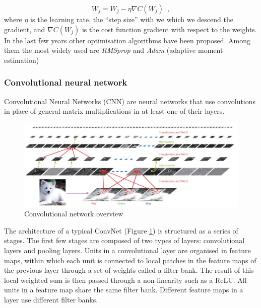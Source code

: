 \begin{equation}
    W_j = W_j - \eta\nabla C(W_j)
    \enspace,
\end{equation}
where $\eta$ is the learning rate, the “step size” with we which we descend the gradient, and $\nabla C(W_j)$ is the cost function gradient with respect to the weights.
In the last few years other optimisation algorithms have been proposed. Among them the most widely used are \textit{RMSprop} and \textit{Adam} (adaptive moment estimation) \citep{kingma2014adam}

\subsubsection{Convolutional neural network} \label{Convolutional Neural Network}

Convolutional Neural Networks (CNN) are neural networks that use convolutions in place of general matrix multiplications in at least one of their layers. 
\begin{figure}
\centerline{\includegraphics[scale=0.7]{images/chapter_2/CNN.jpg}}
\caption{Convolutional network overview \citep{DBLP:journals/nature/LeCunBH15}}
\label{fig:cnn_overview}
\end{figure}
The architecture of a typical ConvNet (Figure \ref{fig:cnn_overview}) is structured as a series of stages. The first few stages are composed of two types of layers: convolutional layers and pooling layers. Units in a convolutional layer are organised in feature maps, within which each unit is connected to local patches in the feature maps of the previous layer through a set of weights called a filter bank. The result of this local weighted sum is then passed through a non-linearity such as a ReLU. All units in a feature map share the same filter bank. Different feature maps in a layer use different filter banks.

